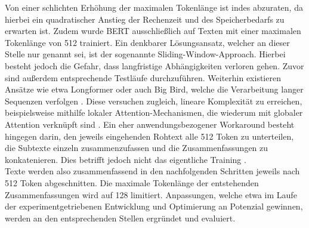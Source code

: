 \noindent
Von einer schlichten Erhöhung der maximalen Tokenlänge ist indes abzuraten, da hierbei ein quadratischer Anstieg der Rechenzeit und des Speicherbedarfs zu erwarten ist. Zudem wurde \ac{BERT} ausschließlich auf Texten mit einer maximalen Tokenlänge von 512 trainiert. Ein denkbarer Lösungsansatz, welcher an dieser Stelle nur genannt sei, ist der sogenannte Sliding-Window-Approach. Hierbei besteht jedoch die Gefahr, dass langfristige Abhängigkeiten verloren gehen. Zuvor sind außerdem entsprechende Testläufe durchzuführen. Weiterhin existieren Ansätze wie etwa Longformer oder auch Big Bird, welche die Verarbeitung langer Sequenzen verfolgen \cite{ZAH21}. Diese versuchen zugleich, lineare Komplexität zu erreichen, beispielsweise mithilfe lokaler Attention-Mechanismen, die wiederum mit globaler Attention verknüpft sind \cite{BEL20}. Ein eher anwendungsbezogener Workaround besteht hingegen darin, den jeweils eingehenden Rohtext alle 512 Token zu unterteilen, die Subtexte einzeln zusammenzufassen und die Zusammenfassungen zu konkatenieren. Dies betrifft jedoch nicht das eigentliche Training \cite[S.~2]{DIN20}.\\

\noindent
Texte werden also zusammenfassend in den nachfolgenden Schritten jeweils nach 512 Token abgeschnitten. Die maximale Tokenlänge der entstehenden Zusammenfassungen wird auf 128 limitiert. Anpassungen, welche etwa im Laufe der experimentgetriebenen Entwicklung und Optimierung an Potenzial gewinnen, werden an den entsprechenden Stellen ergründet und evaluiert.\\
